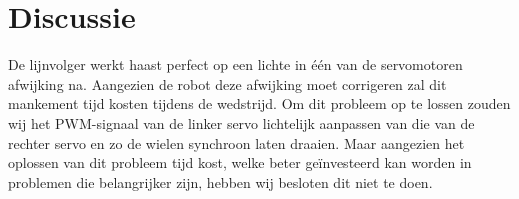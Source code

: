 \documentclass{report}
\begin{document}
\section{Discussie}
De lijnvolger werkt haast perfect op een lichte in één van de servomotoren afwijking na.
Aangezien de robot deze afwijking moet corrigeren zal dit mankement tijd kosten tijdens de wedstrijd.
Om dit probleem op te lossen zouden wij het PWM-signaal van de linker servo lichtelijk aanpassen van die van de rechter servo en zo de wielen synchroon laten draaien.
Maar aangezien het oplossen van dit probleem tijd kost, welke beter geïnvesteerd kan worden in problemen die belangrijker zijn, hebben wij besloten dit niet te doen.
\end{document}
